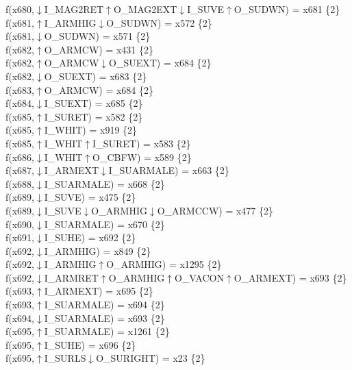 f(x680,$\downarrow$I\_MAG2RET$\uparrow$O\_MAG2EXT$\downarrow$I\_SUVE$\uparrow$O\_SUDWN) = x681 \{2\} \\  
f(x681,$\uparrow$I\_ARMHIG$\downarrow$O\_SUDWN) = x572 \{2\} \\  
f(x681,$\downarrow$O\_SUDWN) = x571 \{2\} \\  
f(x682,$\uparrow$O\_ARMCW) = x431 \{2\} \\  
f(x682,$\uparrow$O\_ARMCW$\downarrow$O\_SUEXT) = x684 \{2\} \\  
f(x682,$\downarrow$O\_SUEXT) = x683 \{2\} \\  
f(x683,$\uparrow$O\_ARMCW) = x684 \{2\} \\  
f(x684,$\downarrow$I\_SUEXT) = x685 \{2\} \\  
f(x685,$\uparrow$I\_SURET) = x582 \{2\} \\  
f(x685,$\uparrow$I\_WHIT) = x919 \{2\} \\  
f(x685,$\uparrow$I\_WHIT$\uparrow$I\_SURET) = x583 \{2\} \\  
f(x686,$\downarrow$I\_WHIT$\uparrow$O\_CBFW) = x589 \{2\} \\  
f(x687,$\downarrow$I\_ARMEXT$\downarrow$I\_SUARMALE) = x663 \{2\} \\  
f(x688,$\downarrow$I\_SUARMALE) = x668 \{2\} \\  
f(x689,$\downarrow$I\_SUVE) = x475 \{2\} \\  
f(x689,$\downarrow$I\_SUVE$\downarrow$O\_ARMHIG$\downarrow$O\_ARMCCW) = x477 \{2\} \\  
f(x690,$\downarrow$I\_SUARMALE) = x670 \{2\} \\  
f(x691,$\downarrow$I\_SUHE) = x692 \{2\} \\  
f(x692,$\downarrow$I\_ARMHIG) = x849 \{2\} \\  
f(x692,$\downarrow$I\_ARMHIG$\uparrow$O\_ARMHIG) = x1295 \{2\} \\  
f(x692,$\downarrow$I\_ARMRET$\uparrow$O\_ARMHIG$\uparrow$O\_VACON$\uparrow$O\_ARMEXT) = x693 \{2\} \\  
f(x693,$\uparrow$I\_ARMEXT) = x695 \{2\} \\  
f(x693,$\uparrow$I\_SUARMALE) = x694 \{2\} \\  
f(x694,$\downarrow$I\_SUARMALE) = x693 \{2\} \\  
f(x695,$\uparrow$I\_SUARMALE) = x1261 \{2\} \\  
f(x695,$\uparrow$I\_SUHE) = x696 \{2\} \\  
f(x695,$\uparrow$I\_SURLS$\downarrow$O\_SURIGHT) = x23 \{2\} \\  
